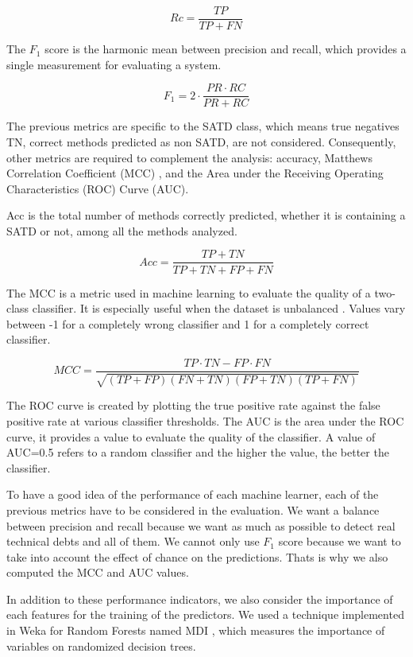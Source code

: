 \[
Rc=\frac{TP}{TP+FN}
\]

The $F_{1}$ score is the harmonic mean between precision and recall, which provides a single measurement for evaluating a system.

\[
F_1=2 \cdot \frac{PR \cdot RC}{PR + RC}
\]

The previous metrics are specific to the \ac{SATD} class, which means true negatives \ac{TN}, correct methods predicted as non \ac{SATD}, are not considered. Consequently, other metrics are required to complement the analysis: accuracy, Matthews Correlation Coefficient (MCC) \citep{matthews1975comparison}, and the Area under the Receiving Operating Characteristics (ROC) Curve (AUC). \par 

\ac{Acc} is the total number of methods correctly predicted, whether it is containing a \ac{SATD} or not, among all the methods analyzed.

\[
Acc=\frac{TP+TN}{TP+TN+FP+FN}
\]

The \ac{MCC} is a metric used in machine learning to evaluate the quality of a two-class classifier. It is especially useful when the dataset is unbalanced \citep{matthews1975comparison}. Values vary between -1 for a completely wrong classifier and 1 for a completely correct classifier. 

\[
MCC=\frac{TP \cdot TN-FP \cdot FN}{\sqrt{(TP+FP)(FN+TN)(FP+TN)(TP+FN)}}
\]

The \ac{ROC} curve is created by plotting the true positive rate against the false positive rate at various classifier thresholds. The \ac{AUC} is the area under the ROC curve, it provides a value to evaluate the quality of the classifier. A value of AUC=0.5 refers to a random classifier and the higher the value, the better the classifier.

To have a good idea of the performance of each machine learner, each of the previous metrics have to be considered in the evaluation. We want a balance between precision and recall because we want as much as possible to detect real technical debts and all of them. We cannot only use $F_{1}$ score because we want to take into account the effect of chance on the predictions. Thats is why we also computed the MCC and AUC values.

In addition to these performance indicators, we also consider the importance of each features for the training of the predictors. We used a technique implemented in Weka for Random Forests named \ac{MDI} \citep{louppe2013understanding}, which measures the importance of variables on randomized decision trees.


